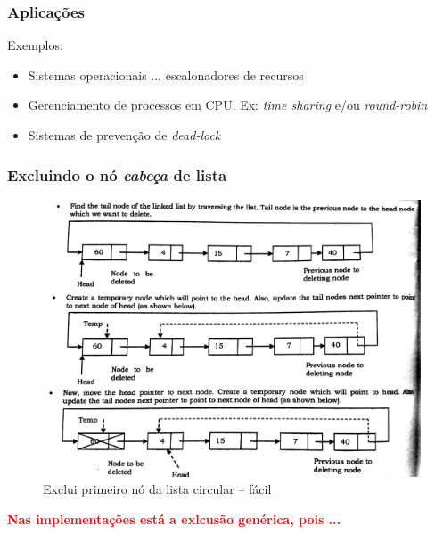 \begin{frame}
\frametitle{Aplicações}

\begin{block}{Exemplos:}
\begin{itemize}
  \item Sistemas operacionais ... escalonadores de recursos
  \item Gerenciamento de processos em CPU. Ex: \textit{time sharing} e/ou \textit{round-robin}
  \item Sistemas de prevenção de \textit{dead-lock}
\end{itemize}
\end{block}

\end{frame} 

\begin{frame}%

\frametitle{Excluindo o nó \textit{cabeça} de lista}

\begin{figure}[!hb]
	\centering
	\includegraphics[height=0.650\paperheight, width=0.67\paperwidth]
	{figs/fig_listas/exclui_prim_no_lista_circular}						
			\caption{Exclui primeiro nó  da lista circular -- fácil}	
			
		\end{figure} 

\textbf{
\textcolor{red}{Nas implementações está a exlcusão genérica, pois ...}
}
\end{frame} 

